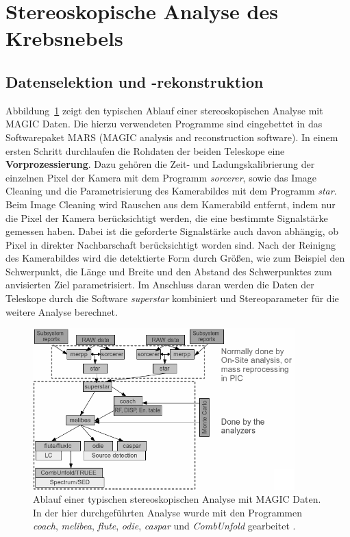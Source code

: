 \section{Stereoskopische Analyse des Krebsnebels}
\label{sec:analyse}

\subsection{Datenselektion und -rekonstruktion}

Abbildung~\ref{fig:analysischain} zeigt den typischen Ablauf einer
stereoskopischen Analyse mit MAGIC Daten. Die hierzu verwendeten Programme sind
eingebettet in das Softwarepaket MARS (MAGIC analysis and reconstruction
software). In einem ersten Schritt durchlaufen die
Rohdaten der beiden Teleskope eine \textbf{Vorprozessierung}. Dazu gehören die
Zeit- und Ladungskalibrierung der einzelnen Pixel der Kamera mit dem Programm
\textit{sorcerer}, sowie das Image Cleaning und die Parametrisierung des
Kamerabildes mit dem Programm \textit{star}. Beim Image Cleaning wird Rauschen
aus dem Kamerabild entfernt, indem nur die Pixel der Kamera berücksichtigt
werden, die eine bestimmte Signalstärke gemessen haben. Dabei ist die geforderte
Signalstärke auch davon abhängig, ob Pixel in direkter Nachbarschaft
berücksichtigt worden sind. Nach der Reinigng des Kamerabildes wird die
detektierte Form durch Größen, wie zum Beispiel den Schwerpunkt, die Länge und
Breite und den Abstand des Schwerpunktes zum anvisierten Ziel parametrisiert.
Im Anschluss daran werden die Daten der Teleskope durch die Software
\textit{superstar} kombiniert und Stereoparameter für die weitere Analyse
berechnet.

\begin{figure}
  \centering
  \includegraphics[width=0.9\textwidth]{figures/analysischain.png}
  \caption{Ablauf einer typischen stereoskopischen Analyse mit MAGIC Daten. In
  der hier durchgeführten Analyse wurde mit den Programmen \textit{coach},
  \textit{melibea}, \textit{flute}, \textit{odie}, \textit{caspar} und
  \textit{CombUnfold} gearbeitet \cite{magic_wiki}.} %
  \label{fig:analysischain}
\end{figure}

